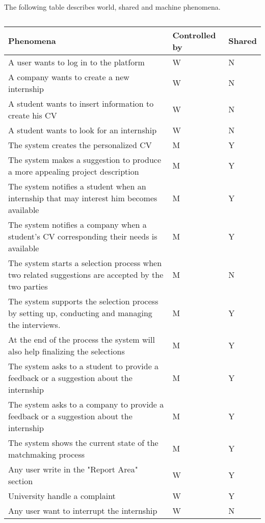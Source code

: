 The following table describes world, shared and machine phenomena.
\begin{center} %
    \begin{longtable}{|p{8.7cm}|p{3cm}|p{3cm}|}
        \caption[Phenomena Table]{}
        \label{table:phenomena}
        \endlastfoot
        \hline
        \rowcolor{gray!50}
        \textbf{Phenomena}                                                                                                                & \textbf{Controlled by} & \textbf{Shared} \\ \hline
        A user wants to log in to the platform & W & N \\ \hline
        A company wants to create a new internship & W & N \\ \hline
        A student wants to insert information to create  his CV   & W  & N \\ \hline
        A student wants to look for an internship & W  & N \\ \hline
        The system creates the personalized CV  & M  & Y \\ \hline
        The system makes a suggestion to produce a more appealing project description  & M  & Y \\ \hline
        The system notifies a student when an internship that may interest him becomes available & M  & Y \\ \hline
        The system notifies a company when a student's CV corresponding their needs is available & M  & Y \\ \hline
        The system starts a selection process when two related suggestions are accepted by the two parties & M  & N \\ \hline
        The system supports the selection process by setting up, conducting and managing the interviews. & M  & Y \\ \hline
        At the end of the process the system will also help finalizing the selections & M  & Y 
        \\ \hline
        The system asks to a student to provide a feedback or a suggestion about the internship & M  & Y \\ \hline
        The system asks to a company to provide a feedback or a suggestion about the internship & M  & Y \\ \hline
        The system shows the current state of the matchmaking process & M  & Y \\ \hline
        Any user write in the "Report Area" section & W  & Y \\ \hline
        University handle a complaint & W  & Y \\ \hline
        Any user want to interrupt the internship & W  & N \\ \hline
    \end{longtable}
\end{center}
\pagebreak

